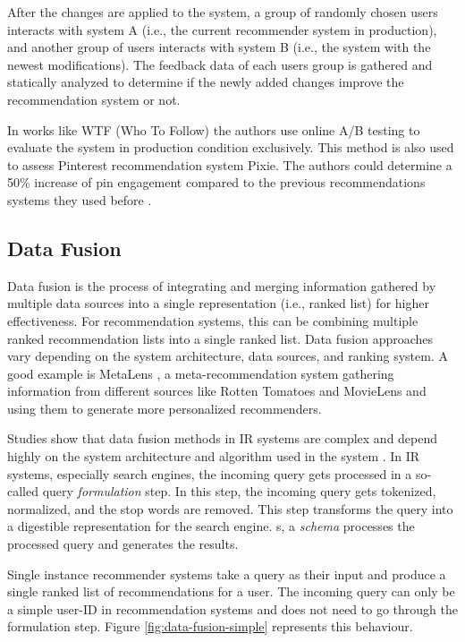 After the changes are applied to the system, a group of randomly chosen users interacts with system A (i.e., the current recommender system in production), and another group of users interacts with system B (i.e., the system with the newest modifications). The feedback data of each users group is gathered and statically analyzed to determine if the newly added changes improve the recommendation system or not.

In works like WTF (Who To Follow) \cite{guptaWTFWhoFollow} the authors use online A/B testing to evaluate the system in production condition exclusively. This method is also used to assess Pinterest recommendation system Pixie. The authors could determine a 50\% increase of pin engagement compared to the previous recommendations systems they used before \cite{eksombatchaiPixieSystemRecommending2018}.


\subsection{Data Fusion}
\label{subsec:data-fusion}
Data fusion is the process of integrating and merging information gathered by multiple data sources into a single representation (i.e., ranked list) for higher effectiveness. For recommendation systems, this can be combining multiple ranked recommendation lists into a single ranked list. Data fusion approaches vary depending on the system architecture, data sources, and ranking system. A good example is MetaLens \cite{schaferMetarecommendationSystemsUsercontrolled}, a meta-recommendation system gathering information from different sources like Rotten Tomatoes and MovieLens and using them to generate more personalized recommenders.


Studies show that data fusion methods in IR systems are complex and depend highly on the system architecture and algorithm used in the system \cite{frankhsuComparingRankScore2005}. In IR systems, especially search engines, the incoming query gets processed in a so-called query \emph{formulation} step. In this step, the incoming query gets tokenized, normalized,  and the stop words are removed. This step transforms the query into a digestible representation for the search engine. s, a \emph{schema} processes the processed query and generates the results. 


Single instance recommender systems take a query as their input and produce a single ranked list of recommendations for a user. The incoming query can only be a simple user-ID in recommendation systems and does not need to go through the formulation step. Figure \ref{fig:data-fusion-simple} represents this behaviour.


